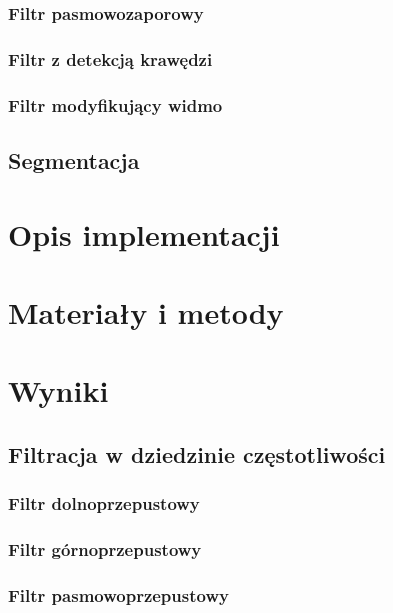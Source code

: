 \documentclass{classrep}
\begin{document}
\subsubsection{Filtr pasmowozaporowy}

\subsubsection{Filtr z detekcją krawędzi}

\subsubsection{Filtr modyfikujący widmo}

\subsection{Segmentacja}

\section{Opis implementacji}


\section{Materiały i metody}



\section{Wyniki}


\subsection{Filtracja w dziedzinie częstotliwości}

\subsubsection{Filtr dolnoprzepustowy}

\subsubsection{Filtr górnoprzepustowy}

\subsubsection{Filtr pasmowoprzepustowy}
\end{document}
